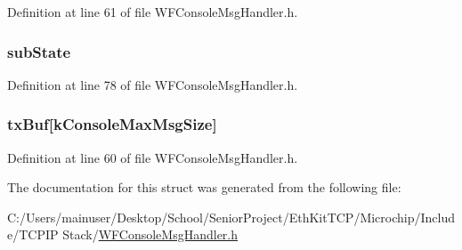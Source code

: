 Definition at line 61 of file W\+F\+Console\+Msg\+Handler.\+h.

\hypertarget{structt_console_context_a6da82751f46dce9c0e0149b73a71cada}{}
\subsubsection[{sub\+State}]{ sub\+State}\label{structt_console_context_a6da82751f46dce9c0e0149b73a71cada}


Definition at line 78 of file W\+F\+Console\+Msg\+Handler.\+h.

\hypertarget{structt_console_context_a18b2174d74840a7023610daeea28f4db}{}
\subsubsection[{tx\+Buf}]{ tx\+Buf\mbox{[}k\+Console\+Max\+Msg\+Size\mbox{]}}\label{structt_console_context_a18b2174d74840a7023610daeea28f4db}


Definition at line 60 of file W\+F\+Console\+Msg\+Handler.\+h.



The documentation for this struct was generated from the following file\+:\begin{DoxyCompactItemize}
\item 
C\+:/\+Users/mainuser/\+Desktop/\+School/\+Senior\+Project/\+Eth\+Kit\+T\+C\+P/\+Microchip/\+Include/\+T\+C\+P\+I\+P Stack/\hyperlink{_w_f_console_msg_handler_8h}{W\+F\+Console\+Msg\+Handler.\+h}\end{DoxyCompactItemize}
